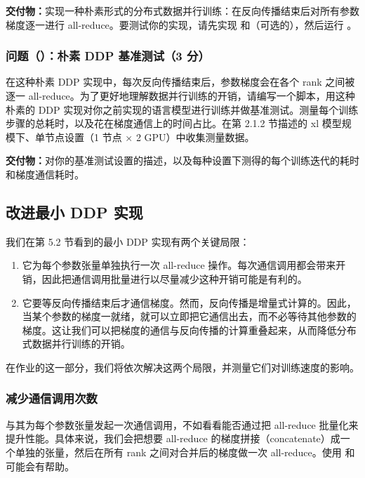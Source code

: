 \textbf{交付物：}实现一种朴素形式的分布式数据并行训练：在反向传播结束后对所有参数梯度逐一进行 all-reduce。要测试你的实现，请先实现  和（可选的），然后运行 。

\subsubsection*{问题（）：朴素 DDP 基准测试（3 分）}

在这种朴素 DDP 实现中，每次反向传播结束后，参数梯度会在各个 rank 之间被逐一 all-reduce。为了更好地理解数据并行训练的开销，请编写一个脚本，用这种朴素的 DDP 实现对你之前实现的语言模型进行训练并做基准测试。测量每个训练步骤的总耗时，以及花在梯度通信上的时间占比。在第 2.1.2 节描述的 xl 模型规模下、单节点设置（1 节点 × 2 GPU）中收集测量数据。

\textbf{交付物：}对你的基准测试设置的描述，以及每种设置下测得的每个训练迭代的耗时和梯度通信耗时。

\subsection{改进最小 DDP 实现}

我们在第 5.2 节看到的最小 DDP 实现有两个关键局限：

\begin{enumerate}
  \item 它为每个参数张量单独执行一次 all-reduce 操作。每次通信调用都会带来开销，因此把通信调用批量进行以尽量减少这种开销可能是有利的。
  \item 它要等反向传播结束后才通信梯度。然而，反向传播是增量式计算的。因此，当某个参数的梯度一就绪，就可以立即把它通信出去，而不必等待其他参数的梯度。这让我们可以把梯度的通信与反向传播的计算重叠起来，从而降低分布式数据并行训练的开销。
\end{enumerate}

在作业的这一部分，我们将依次解决这两个局限，并测量它们对训练速度的影响。

\subsubsection{减少通信调用次数}

与其为每个参数张量发起一次通信调用，不如看看能否通过把 all-reduce 批量化来提升性能。具体来说，我们会把想要 all-reduce 的梯度拼接（concatenate）成一个单独的张量，然后在所有 rank 之间对合并后的梯度做一次 all-reduce。使用  和  可能会有帮助。

